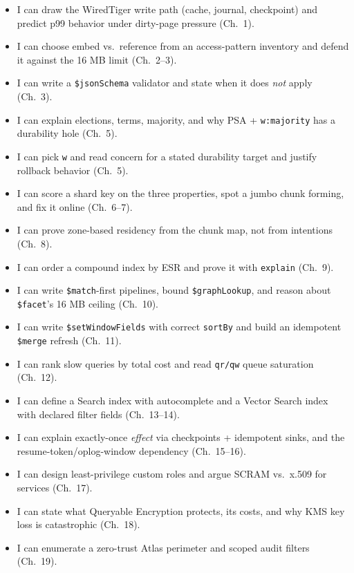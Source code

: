 \begin{itemize}
    \item[$\square$] I can draw the WiredTiger write path (cache, journal, checkpoint) and predict p99 behavior under dirty-page pressure (Ch.~1).
    \item[$\square$] I can choose embed vs.\ reference from an access-pattern inventory and defend it against the 16 MB limit (Ch.~2--3).
    \item[$\square$] I can write a \texttt{\$jsonSchema} validator and state when it does \emph{not} apply (Ch.~3).
    \item[$\square$] I can explain elections, terms, majority, and why PSA + \texttt{w:majority} has a durability hole (Ch.~5).
    \item[$\square$] I can pick \texttt{w} and read concern for a stated durability target and justify rollback behavior (Ch.~5).
    \item[$\square$] I can score a shard key on the three properties, spot a jumbo chunk forming, and fix it online (Ch.~6--7).
    \item[$\square$] I can prove zone-based residency from the chunk map, not from intentions (Ch.~8).
    \item[$\square$] I can order a compound index by ESR and prove it with \texttt{explain} (Ch.~9).
    \item[$\square$] I can write \texttt{\$match}-first pipelines, bound \texttt{\$graphLookup}, and reason about \texttt{\$facet}'s 16 MB ceiling (Ch.~10).
    \item[$\square$] I can write \texttt{\$setWindowFields} with correct \texttt{sortBy} and build an idempotent \texttt{\$merge} refresh (Ch.~11).
    \item[$\square$] I can rank slow queries by total cost and read \texttt{qr/qw} queue saturation (Ch.~12).
    \item[$\square$] I can define a Search index with autocomplete and a Vector Search index with declared filter fields (Ch.~13--14).
    \item[$\square$] I can explain exactly-once \emph{effect} via checkpoints + idempotent sinks, and the resume-token/oplog-window dependency (Ch.~15--16).
    \item[$\square$] I can design least-privilege custom roles and argue SCRAM vs.\ x.509 for services (Ch.~17).
    \item[$\square$] I can state what Queryable Encryption protects, its costs, and why KMS key loss is catastrophic (Ch.~18).
    \item[$\square$] I can enumerate a zero-trust Atlas perimeter and scoped audit filters (Ch.~19).

\end{itemize}
